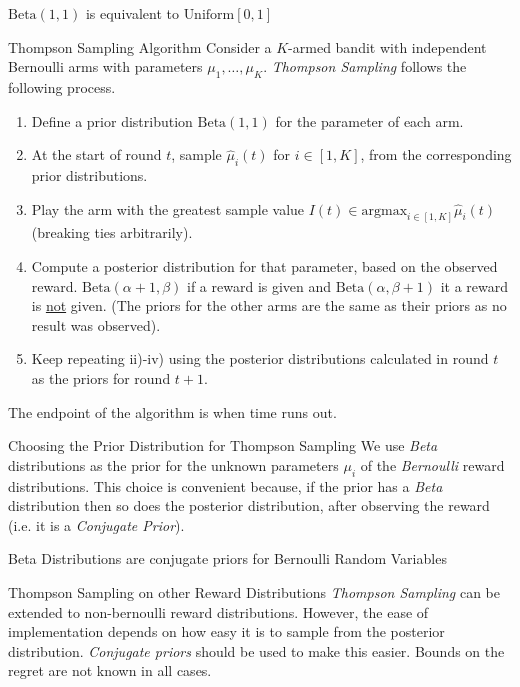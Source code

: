\documentclass[11pt,a4paper]{article}
\begin{document}
  \begin{remark}{$\text{Beta}(1,1)$ is equivalent to $\text{Uniform}[0,1]$}

  \end{remark}

  \begin{proposition}{Thompson Sampling Algorithm}
    Consider a $K$-armed bandit with independent Bernoulli arms with parameters $\mu_1,\dots,\mu_K$. \textit{Thompson Sampling} follows the following process.
    \begin{enumerate}
      \item Define a prior distribution $\text{Beta}(1,1)$ for the parameter of each arm.
      \item At the start of round $t$, sample $\hat\mu_i(t)$ for $i\in[1,K]$, from the corresponding prior distributions.
      \item Play the arm with the greatest sample value $I(t)\in\text{argmax}_{i\in[1,K]}\hat\mu_i(t)$ (breaking ties arbitrarily).
      \item Compute a posterior distribution for that parameter, based on the observed reward. $\text{Beta}(\alpha+1,\beta)$ if a reward is given and $\text{Beta}(\alpha,\beta+1)$ it a reward is \underline{not} given. (The priors for the other arms are the same as their priors as no result was observed).
      \item Keep repeating ii)-iv) using the posterior distributions calculated in round $t$ as the priors for round $t+1$.
    \end{enumerate}
    The endpoint of the algorithm is when time runs out.
  \end{proposition}

  \begin{proposition}{Choosing the Prior Distribution for Thompson Sampling}
    We use \textit{Beta} distributions as the prior for the unknown parameters $\mu_i$ of the \textit{Bernoulli} reward distributions. This choice is convenient because, if the prior has a \textit{Beta} distribution then so does the posterior distribution, after observing the reward (i.e. it is a \textit{Conjugate Prior}).
  \end{proposition}

  \begin{remark}{Beta Distributions are conjugate priors for Bernoulli Random Variables}
  \end{remark}

  \begin{remark}{Thompson Sampling on other Reward Distributions}
    \textit{Thompson Sampling} can be extended to non-bernoulli reward distributions. However, the ease of implementation depends on how easy it is to sample from the posterior distribution. \textit{Conjugate priors} should be used to make this easier. Bounds on the regret are not known in all cases.
  \end{remark}
\end{document}
